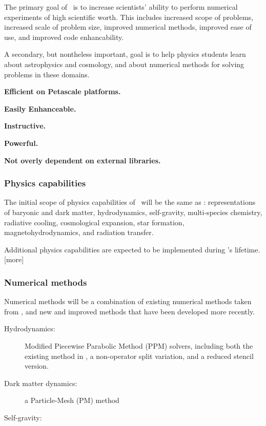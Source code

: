 \documentclass[11pt]{article}
\begin{document}
    The primary goal of \cello\ is to increase scientists' ability to
    perform numerical experiments of high scientific worth.  This
    includes increased scope of problems, increased scale of problem
    size, improved numerical methods, improved ease of use, and
    improved code enhancability.

    A secondary, but nontheless important, goal is to help
    physics students learn about astrophysics and cosmology, and
    about numerical methods for solving problems in these
    domains.

    \textbf{Efficient on Petascale platforms.}

    \textbf{Easily Enhanceable.}

    \textbf{Instructive.}  

    \textbf{Powerful.}

    \textbf{Not overly dependent on external libraries.}

    \subsubsection{Physics capabilities}

    The initial scope of physics capabilities of \cello\ will be the
    same as \enzo: representations of baryonic and dark matter,
    hydrodynamics, self-gravity, multi-species chemistry, radiative
    cooling, cosmological expansion, star formation,
    magnetohydrodynamics, and radiation transfer.

    Additional physics capabilities are expected to be implemented
    during \cello's lifetime.  [more]

    \subsubsection{Numerical methods}

    Numerical methods will be a combination of existing numerical
    methods taken from \enzo, and new and improved methods that
    have been developed more recently.

    \begin{description}
% 
    \item[Hydrodynamics: ] Modified Piecewise Parabolic Method (PPM)
    solvers, including both the existing method in \enzo, a
    non-operator split variation, and a reduced stencil version.
%
    \item[Dark matter dynamics: ] a Particle-Mesh (PM) method
%
    \item[Self-gravity: ]  
    \end{description}
\end{document}
